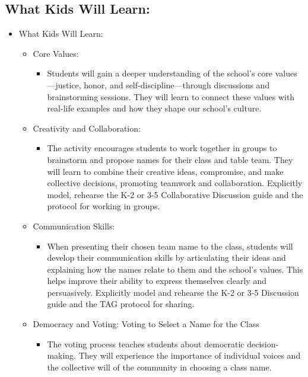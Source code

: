 \documentclass[14pt, letterpaper, twoside]{article}
\begin{document}
	\subsection{What Kids Will Learn:}
		\begin{itemize}
		\item What Kids Will Learn:
			\begin{itemize}
			\item Core Values: 
				\begin{itemize}
				\item Students will gain a deeper understanding of the school's core values—justice, honor, and self-discipline—through discussions and 						brainstorming sessions. They will learn to connect these values with real-life examples and how they shape our school's culture.
				\end{itemize}
			\item Creativity and Collaboration:
				\begin{itemize}
				\item The activity encourages students to work together in groups to brainstorm and propose names for their class and table team. They 						will learn to combine their creative ideas, compromise, and make collective decisions, promoting teamwork and collaboration. Explicitly 						model, rehearse the K-2 or 3-5 Collaborative Discussion guide and the protocol for working in groups.
				\end{itemize}
			\item Communication Skills:
				\begin{itemize}
				\item When presenting their chosen team name to the class, students will develop their communication skills by articulating their ideas 						and explaining how the names relate to them and the school's values. This helps improve their ability to express themselves clearly and 						persuasively. Explicitly model and rehearse the K-2 or 3-5 Discussion guide and the TAG protocol for sharing.
				\end{itemize}
			\item Democracy and Voting: Voting to Select a Name for the Class
				\begin{itemize}
				\item The voting process teaches students about democratic decision-making. They will experience the importance of individual voices and 						the collective will of the community in choosing a class name.
				\end{itemize}

\end{itemize}
\end{itemize}
\end{document}
